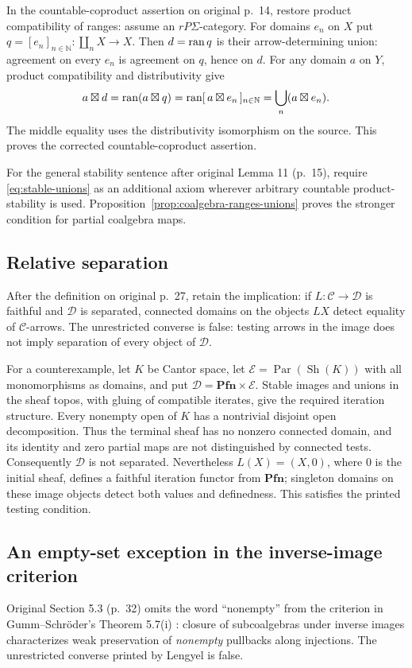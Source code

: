 \documentclass[11pt]{article}
\newcommand{\C}{\mathcal C}\newcommand{\D}{\mathcal D}\newcommand{\B}{\mathcal B}
\begin{document}
In the countable-coproduct assertion on original p.~14, restore product compatibility of ranges: assume an $rP\Sigma$-category. For domains $e_n$ on $X$ put $q=[e_n]_{n\in\mathbb N}:\coprod_nX\to X$. Then $d=\operatorname{ran} q$ is their arrow-determining union: agreement on every $e_n$ is agreement on $q$, hence on $d$. For any domain $a$ on $Y$, product compatibility and distributivity give
\[
a\boxtimes d=\operatorname{ran}(a\boxtimes q)
=\operatorname{ran}[\,a\boxtimes e_n\,]_{n\in\mathbb N}
=\bigcup_n(a\boxtimes e_n).
\]
The middle equality uses the distributivity isomorphism on the source. This proves the corrected countable-coproduct assertion.

For the general stability sentence after original Lemma 11 (p.~15), require \eqref{eq:stable-unions} as an additional axiom wherever arbitrary countable product-stability is used. Proposition~\ref{prop:coalgebra-ranges-unions} proves the stronger condition for partial coalgebra maps.

\subsection{Relative separation}
After the definition on original p.~27, retain the implication: if $L:\C\to\D$ is faithful and $\D$ is separated, connected domains on the objects $LX$ detect equality of $\C$-arrows. The unrestricted converse is false: testing arrows in the image does not imply separation of every object of $\D$.

For a counterexample, let $K$ be Cantor space, let $\mathcal E=\operatorname{Par}(\operatorname{Sh}(K))$ with all monomorphisms as domains, and put $\D=\mathbf{Pfn}\times\mathcal E$. Stable images and unions in the sheaf topos, with gluing of compatible iterates, give the required iteration structure. Every nonempty open of $K$ has a nontrivial disjoint open decomposition. Thus the terminal sheaf has no nonzero connected domain, and its identity and zero partial maps are not distinguished by connected tests. Consequently $\D$ is not separated. Nevertheless $L(X)=(X,0)$, where $0$ is the initial sheaf, defines a faithful iteration functor from $\mathbf{Pfn}$; singleton domains on these image objects detect both values and definedness. This satisfies the printed testing condition.

\subsection{An empty-set exception in the inverse-image criterion}\label{sec:inverse-image-exception}
Original Section 5.3 (p.~32) omits the word ``nonempty'' from the criterion in Gumm--Schr\"oder's Theorem 5.7(i) \cite{GSW}: closure of subcoalgebras under inverse images characterizes weak preservation of \emph{nonempty} pullbacks along injections. The unrestricted converse printed by Lengyel is false.
\end{document}
